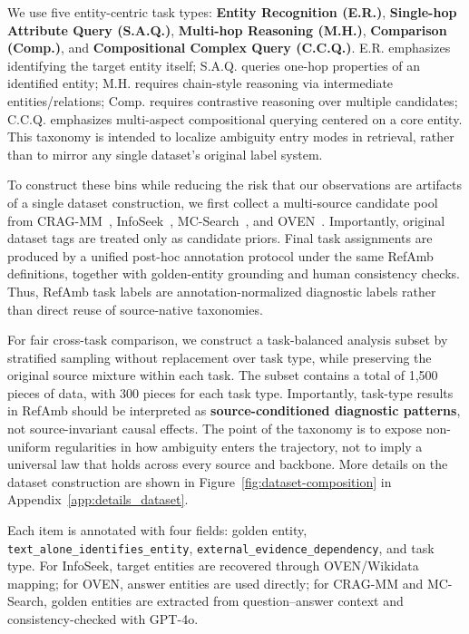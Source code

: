 \documentclass{article} %
\begin{document}
We use five entity-centric task types:
\textbf{Entity Recognition (E.R.)},
\textbf{Single-hop Attribute Query (S.A.Q.)},
\textbf{Multi-hop Reasoning (M.H.)},
\textbf{Comparison (Comp.)},
and \textbf{Compositional Complex Query (C.C.Q.)}.
E.R. emphasizes identifying the target entity itself;
S.A.Q. queries one-hop properties of an identified entity;
M.H. requires chain-style reasoning via intermediate entities/relations;
Comp. requires contrastive reasoning over multiple candidates;
C.C.Q. emphasizes multi-aspect compositional querying centered on a core entity.
This taxonomy is intended to localize ambiguity entry modes in retrieval, rather than to mirror any single dataset's original label system.

To construct these bins while reducing the risk that our observations are artifacts of a single dataset construction, we first collect a multi-source candidate pool from CRAG-MM~\citep{yang2024crag}, InfoSeek~\citep{chen2023can}, MC-Search~\citep{ning2026mc}, and OVEN~\citep{hu2023open}.
Importantly, original dataset tags are treated only as candidate priors.
Final task assignments are produced by a unified post-hoc annotation protocol under the same RefAmb definitions, together with golden-entity grounding and human consistency checks.
Thus, RefAmb task labels are annotation-normalized diagnostic labels rather than direct reuse of source-native taxonomies.

For fair cross-task comparison, we construct a task-balanced analysis subset by stratified sampling without replacement over task type, while preserving the original source mixture within each task. The subset contains a total of 1,500 pieces of data, with 300 pieces for each task type.
Importantly, task-type results in RefAmb should be interpreted as \textbf{source-conditioned diagnostic patterns}, not source-invariant causal effects. The point of the taxonomy is to expose non-uniform regularities in how ambiguity enters the trajectory, not to imply a universal law that holds across every source and backbone. More details on the dataset construction are shown in Figure~\ref{fig:dataset-composition} in Appendix~\ref{app:details_dataset}.

Each item is annotated with four fields: golden entity, \texttt{text\_alone\_identifies\_entity}, \texttt{external\_evidence\_dependency}, and task type.
For InfoSeek, target entities are recovered through OVEN/Wikidata mapping; for OVEN, answer entities are used directly; for CRAG-MM and MC-Search, golden entities are extracted from question--answer context and consistency-checked with GPT-4o.
\end{document}
